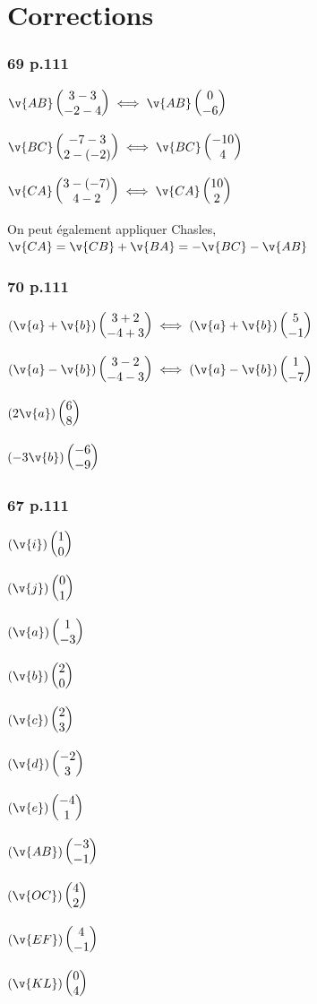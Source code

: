 \documentclass[10pt,a4paper,openany,twoside, prof]{book}
\begin{document}
\entetegal{}


\section*{Corrections}
\subsubsection*{69 p.111}
$\v{AB} \coordvp{3-3}{-2-4} \iff \v{AB} \coordvp{0}{-6} $

$\v{BC} \coordvp{-7-3}{2-(-2)} \iff \v{BC} \coordvp{-10}{4} $

$\v{CA} \coordvp{3-(-7)}{4-2} \iff \v{CA} \coordvp{10}{2} $

On peut également appliquer Chasles, $\v{CA} = \v{CB} +\v{BA} = -\v{BC} - \v{AB}$

\subsubsection*{70 p.111}
$(\v{a}+\v{b}) \coordvp{3+2}{-4+3} \iff (\v{a}+\v{b}) \coordvp{5}{-1}$

$(\v{a}-\v{b}) \coordvp{3-2}{-4-3} \iff (\v{a}-\v{b}) \coordvp{1}{-7}$

$(2\v{a}) \coordvp{6}{8}$

$(-3\v{b}) \coordvp{-6}{-9}$

\subsubsection*{67 p.111}
$(\v{i}) \coordvp{1}{0}$

$(\v{j}) \coordvp{0}{1}$

$(\v{a}) \coordvp{1}{-3}$

$(\v{b}) \coordvp{2}{0}$

$(\v{c}) \coordvp{2}{3}$

$(\v{d}) \coordvp{-2}{3}$

$(\v{e}) \coordvp{-4}{1}$

$(\v{AB}) \coordvp{-3}{-1}$

$(\v{OC}) \coordvp{4}{2}$

$(\v{EF}) \coordvp{4}{-1}$

$(\v{KL}) \coordvp{0}{4}$
\end{document}
